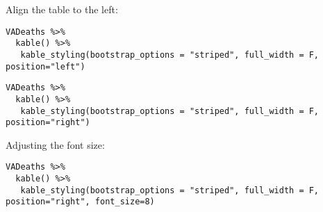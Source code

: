 \documentclass[]{article}
\begin{document}
Align the table to the left:

\begin{verbatim}
VADeaths %>%
  kable() %>%
   kable_styling(bootstrap_options = "striped", full_width = F, position="left") 
\end{verbatim}

\begin{verbatim}
VADeaths %>%
  kable() %>%
   kable_styling(bootstrap_options = "striped", full_width = F, position="right") 
\end{verbatim}

Adjusting the font size:

\begin{verbatim}
VADeaths %>%
  kable() %>%
   kable_styling(bootstrap_options = "striped", full_width = F, position="right", font_size=8) 
\end{verbatim}
\end{document}
